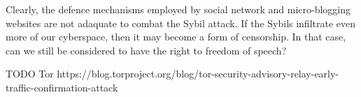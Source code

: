 Clearly, the defence mechanisms employed by social network and micro-blogging
websites are not adaquate to combat the Sybil attack. If the Sybils infiltrate
even more of our cyberspace, then it may become a form of censorship. In that
case, can we still be considered to have the right to freedom of speech?

TODO Tor
https://blog.torproject.org/blog/tor-security-advisory-relay-early-traffic-confirmation-attack

